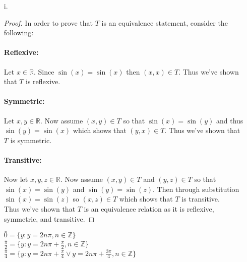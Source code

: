 \documentclass[11pt]{amsart}
\theoremstyle{definition}
\begin{document}
\begin{itemize}
\begin{itemize}
\begin{proof}
        \paragraph{Transitive:}
            Let $a,b,c\in\mathbb{N}-\{1\}$. Then $a=m2^n$, $b=x2^y$, and $c=k2^j$ where $m,x,k\in\mathbb{N}$,$n,y,j\in\mathbb{N}\cup\{0\}$ and $2\nmid m,x,k$. Now assume $(a,b)\in R$ and $(b,c)\in R$ so that $n=y$ and $y=j$. Then $n=j$ therefore $a$ and $c$ have the same number of prime factors of $2$ so $(a,c)\in R$. This shows that the relation is transitive.\\
        Thus we've shown that $R$ is an equivalence relation as it is reflexive, symmetric, and transitive.
    \end{proof}
    $2,3,5\in\bar{7}$\\
    $2,3,5\in\bar{10}$ \\
    $8,24,40\in\bar{72}$

    \item[i.]
    \begin{proof}
        In order to prove that $T$ is an equivalence statement, consider the following:
        \paragraph{Reflexive:}
            Let $x\in\mathbb{R}$. Since $\sin(x)=\sin(x)$ then $(x,x)\in T$. Thus we've shown that $T$ is reflexive.
        \paragraph{Symmetric:}
            Let $x,y\in\mathbb{R}$. Now assume $(x,y)\in T$ so that $\sin(x)=\sin(y)$ and thus $\sin(y)=\sin(x)$ which shows that $(y,x)\in T$. Thus we've shown that $T$ is symmetric.
        \paragraph{Transitive:}
            Now let $x,y,z\in\mathbb{R}$. Now assume $(x,y)\in T$ and $(y,z)\in T$ so that $\sin(x)=\sin(y)$ and $\sin(y)=\sin(z)$. Then through substitution $\sin(x)=\sin(z)$ so $(x,z)\in T$ which shows that $T$ is transitive. \\
        Thus we've shown that $T$ is an equivalence relation as it is reflexive, symmetric, and transitive.
    \end{proof}
    $\bar 0=\{y:y=2n\pi,n\in\mathbb{Z}\}$\\
    $\bar {\frac\pi2}=\{y:y=2n\pi+\frac\pi2,n\in\mathbb{Z}\}$\\
    $\bar {\frac\pi4}=\{y:y=2n\pi+\frac\pi4\lor y=2n\pi+\frac{3\pi}4,n\in\mathbb{Z}\}$
    

\end{itemize}
\end{itemize}
\end{document}
